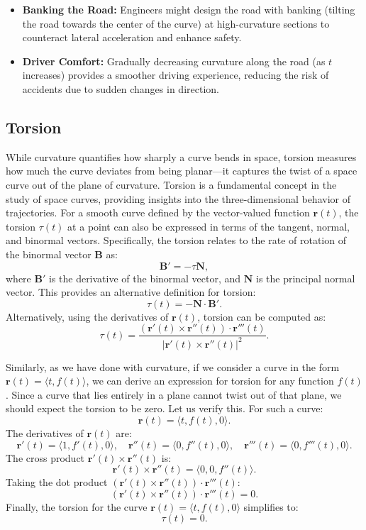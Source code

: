 \begin{example}
\begin{solution}
\begin{enumerate}
\begin{itemize}
        \item \textbf{Banking the Road:} Engineers might design the road with banking (tilting the road towards the center of the curve) at high-curvature sections to counteract lateral acceleration and enhance safety.
        \item \textbf{Driver Comfort:} Gradually decreasing curvature along the road (as \( t \) increases) provides a smoother driving experience, reducing the risk of accidents due to sudden changes in direction.
    \end{itemize}
\end{enumerate}
\end{solution}
\end{example}
\exampleline


\subsection*{Torsion} 

\noindent While curvature quantifies how sharply a curve bends in space, torsion measures how much the curve deviates from being planar—it captures the twist of a space curve out of the plane of curvature. Torsion is a fundamental concept in the study of space curves, providing insights into the three-dimensional behavior of trajectories. For a smooth curve defined by the vector-valued function \( \mathbf{r}(t) \), the torsion \( \tau(t) \) at a point can also be expressed in terms of the tangent, normal, and binormal vectors. Specifically, the torsion relates to the rate of rotation of the binormal vector \( \mathbf{B} \) as:
\[
\mathbf{B}' = -\tau \mathbf{N},
\]
where \( \mathbf{B}' \) is the derivative of the binormal vector, and \( \mathbf{N} \) is the principal normal vector. This provides an alternative definition for torsion:
\[
\tau(t) = -\mathbf{N} \cdot \mathbf{B}'.
\]
Alternatively, using the derivatives of \( \mathbf{r}(t) \), torsion can be computed as:
\[
\tau(t) = \frac{ \left( \mathbf{r}'(t) \times \mathbf{r}''(t) \right) \cdot \mathbf{r}'''(t) }{ \left| \mathbf{r}'(t) \times \mathbf{r}''(t) \right|^2 }.
\]

\noindent Similarly, as we have done with curvature, if we consider a curve in the form \( \mathbf{r}(t) = \langle t, f(t) \rangle \), we can derive an expression for torsion for any function \( f(t) \). Since a curve that lies entirely in a plane cannot twist out of that plane, we should expect the torsion to be zero. Let us verify this. For such a curve:
\[
\mathbf{r}(t) = \langle t, f(t), 0 \rangle.
\]
The derivatives of \( \mathbf{r}(t) \) are:
\[
\mathbf{r}'(t) = \langle 1, f'(t), 0 \rangle, \quad 
\mathbf{r}''(t) = \langle 0, f''(t), 0 \rangle, \quad 
\mathbf{r}'''(t) = \langle 0, f'''(t), 0 \rangle.
\]
The cross product \( \mathbf{r}'(t) \times \mathbf{r}''(t) \) is:
\[
\mathbf{r}'(t) \times \mathbf{r}''(t) = \langle 0, 0, f''(t) \rangle.
\]
Taking the dot product \( \left( \mathbf{r}'(t) \times \mathbf{r}''(t) \right) \cdot \mathbf{r}'''(t) \):
\[
\left( \mathbf{r}'(t) \times \mathbf{r}''(t) \right) \cdot \mathbf{r}'''(t) = 0.
\]
Finally, the torsion for the curve \( \mathbf{r}(t) = \langle t, f(t), 0 \rangle \) simplifies to:
\[
\tau(t) = 0.
\]

